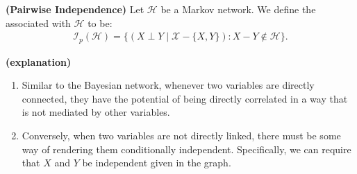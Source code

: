 \documentclass{article}
\newcommand{\bfs}[1]{\textbf{({#1}) }}
\begin{document}
\begin{defa}\bfs{Pairwise Independence}
Let $\mathcal{H}$ be a Markov network. We define the  associated with $\mathcal{H}$ to be:
\begin{align*}
\mathcal{I}_{p}(\mathcal{H})=\{(X \perp Y \mid \mathcal{X}-\{X, Y\}): X-Y \notin \mathcal{H}\} .
\end{align*}
\end{defa}
\begin{rema}\bfs{explanation}
\begin{enumerate}
    \item  Similar to the Bayesian network, whenever two variables are directly connected, they have the potential of being directly correlated in a way that is not mediated by other variables. 
    \item Conversely, when two variables are not directly linked, there must be some way of rendering them conditionally independent. Specifically, we can require that $X$ and $Y$ be independent given  in the graph.
\end{enumerate}
\end{rema}
\end{document}
